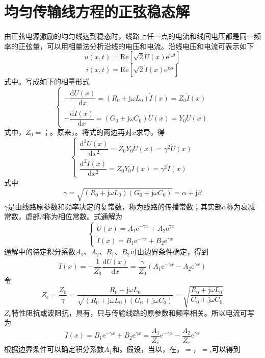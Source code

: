 \section{均匀传输线方程的正弦稳态解}
由正弦电源激励的均匀线达到稳态时，线路上任一点的电流和线间电压都是同一频率的正弦量，可以用相量法分析沿线的电压和电流。沿线电压和电流可表示如下
\[
u(x,t)=\text{Re}\left[\sqrt{2}\dot{U}(x)\text{e}^{\text{j}\omega t}\right]
\]
\[
i(x,t)=\text{Re}\left[\sqrt{2}\dot{I}(x)\text{e}^{\text{j}\omega t}\right]
\]
式中。写成如下的相量形式
\[
\begin{cases}
-\dfrac{\mathrm{d}\dot{U}(x)}{\mathrm{d}x} = \left(R_0 + \mathrm{j}\omega L_0\right)\dot{I}(x) = Z_0 \dot{I}(x) \\
-\dfrac{\mathrm{d}\dot{I}(x)}{\mathrm{d}x} = \left(G_0 + \mathrm{j}\omega C_0\right)\dot{U}(x) = Y_0 \dot{U}(x)
\end{cases}
\]
式中，$Z_0=$；。原来，。将式的两边再对$x$求导，得
\[
\begin{cases}
\dfrac{\mathrm{d}^2 \dot{U}(x)}{\mathrm{d}x^2} = Z_0 Y_0 \dot{U}(x) = \gamma^2 \dot{U}(x) \\
\dfrac{\mathrm{d}^2 \dot{I}(x)}{\mathrm{d}x^2} = Z_0 Y_0 \dot{I}(x) = \gamma^2 \dot{I}(x)
\end{cases}
\]
式中
\[
\gamma = \sqrt{\left(R_0 + \mathrm{j}\omega L_0\right)\left(G_0 + \mathrm{j}\omega C_0\right)} = \alpha + \mathrm{j}\beta
\]
$\gamma$是由线路原参数和频率决定的复常数，称为线路的传播常数；其实部$\alpha$称为衰减常数，虚部$\beta$称为相位常数。式通解为
\[
\begin{cases}
\dot{U}(x) = A_1 \mathrm{e}^{-\gamma x} + A_2 \mathrm{e}^{\gamma x} \\
\dot{I}(x) = B_1 \mathrm{e}^{-\gamma x} + B_2 \mathrm{e}^{\gamma x}
\end{cases}
\]
通解中的待定积分系数$A_1$、$A_2$、$B_1$、$B_2$可由边界条件确定，得到
\[
\dot{I}(x) = -\frac{1}{Z_0}\frac{\mathrm{d}\dot{U}(x)}{\mathrm{d}x} = \frac{\gamma}{Z_0}\left(A_1 \mathrm{e}^{-\gamma x} - A_2 \mathrm{e}^{\gamma x}\right)
\]
令
\[
Z_{\mathrm{c}} = \frac{Z_0}{\gamma} = \frac{R_0 + \mathrm{j}\omega L_0}{\sqrt{\left(R_0 + \mathrm{j}\omega L_0\right)\left(G_0 + \mathrm{j}\omega C_0\right)}} = \sqrt{\frac{R_0 + \mathrm{j}\omega L_0}{G_0 + \mathrm{j}\omega C_0}}
\]
$Z_\mathrm{c}$特性阻抗或波阻抗，具有，只与传输线路的原参数和频率相关。所以电流可写为
\[
\dot{I}(x) = B_1 \mathrm{e}^{-\gamma x} + B_2 \mathrm{e}^{\gamma x} = \frac{A_1}{Z_{\mathrm{c}}} \mathrm{e}^{-\gamma x} - \frac{A_2}{Z_{\mathrm{c}}} \mathrm{e}^{\gamma x}
\]
根据边界条件可以确定积分系数$A_1$和。假设，当以，在，$=$，$=$,可以得到
